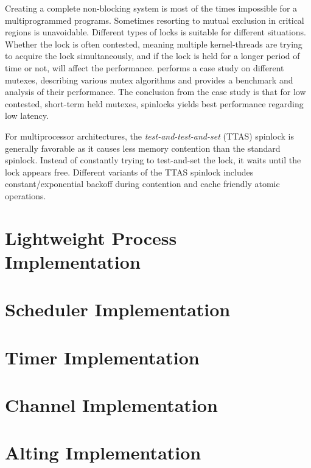Creating a complete non\hyp{}blocking system is most of the times impossible for a multiprogrammed programs. Sometimes resorting to mutual exclusion in critical regions is unavoidable. Different types of locks is suitable for different situations. Whether the lock is often contested, meaning multiple kernel\hyp{}threads are trying to acquire the lock simultaneously, and if the lock is held for a longer period of time or not, will affect the performance.  performs a case study on different mutexes, describing various mutex algorithms and provides a benchmark and analysis of their performance. The conclusion from the case study is that for low contested, short\hyp{}term held mutexes, spinlocks yields best performance regarding low latency. 

For multiprocessor architectures, the \textit{test\hyp{}and\hyp{}test\hyp{}and\hyp{}set} (TTAS) spinlock is generally favorable as it causes less memory contention than the standard spinlock. Instead of constantly trying to test\hyp{}and\hyp{}set the lock, it waits until the lock appears free. Different variants of the TTAS spinlock includes constant/exponential backoff during contention and cache friendly atomic operations.

\section{Lightweight Process Implementation}


\section{Scheduler Implementation}


\section{Timer Implementation}

\section{Channel Implementation}


\section{Alting Implementation}


